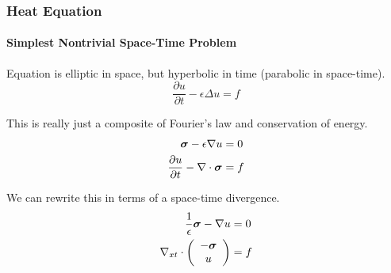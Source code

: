 \documentclass[18pt,xcolor=table]{beamer}
\begin{document}
%                                          
%                                          
%  
\begin{frame}[t]
\frametitle{Heat Equation}
\framesubtitle{Simplest Nontrivial Space-Time Problem}  %

Equation is elliptic in space, but hyperbolic in time (parabolic in space-time).
\begin{equation*}
  \frac{\partial u}{\partial t}-\epsilon\Delta u=f
\end{equation*}

This is really just a composite of Fourier's law and conservation of energy.
\begin{equation*}
\begin{aligned}
\boldsymbol\sigma-\epsilon\nabla u&=0\\
\frac{\partial u}{\partial t}-\nabla\cdot\boldsymbol\sigma&=f
\end{aligned}
\end{equation*}

We can rewrite this in terms of a space-time divergence.
\begin{equation*}
\begin{aligned}
\frac{1}{\epsilon}\boldsymbol\sigma-\nabla u&=0\\
\nabla_{xt}\cdot\left( \begin{array}{c} -\boldsymbol\sigma\\ u\\ \end{array} \right)&=f
\end{aligned}
\end{equation*}
\end{frame}

\end{document}
